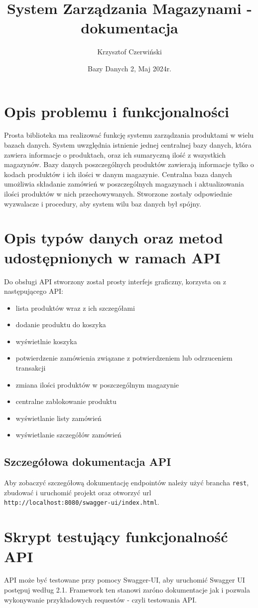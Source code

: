 \documentclass{article}
\title{System Zarządzania Magazynami - dokumentacja}
\author{Krzysztof Czerwiński}
\date{Bazy Danych 2, Maj 2024r.}
\begin{document}
\maketitle

\section{Opis problemu i funkcjonalności}
Prosta biblioteka ma realizować funkcję systemu zarządzania produktami w wielu bazach danych. System uwzględnia istnienie jednej centralnej bazy danych, która zawiera informacje o produktach, oraz ich sumaryczną ilość z wszystkich magazynów. Bazy danych poszczególnych produktów zawierają informacje tylko o kodach produktów i ich ilości w danym magazynie. Centralna baza danych umożliwia składanie zamówień w poszczególnych magazynach i aktualizowania ilości produktów w nich przechowywanych. Stworzone zostały odpowiednie wyzwalacze i procedury, aby system wilu baz danych był spójny.
\section{Opis typów danych oraz metod udostępnionych w ramach API}
Do obsługi API stworzony został prosty interfejs graficzny, korzysta on z następującego API:
\begin{itemize}
    \item lista produktów wraz z ich szczegółami
    \item dodanie produktu do koszyka
    \item wyświetlnie koszyka
    \item potwierdzenie zamówienia związane z potwierdzeniem lub odrzuceniem transakcji
    \item zmiana ilości produktów w poszczególnym magazynie
    \item centralne zablokowanie produktu
    \item wyświetlanie listy zamówień
    \item wyświetlanie szczegółów zamówień
\end{itemize}
\subsection{Szczegółowa dokumentacja API}
Aby zobaczyć szczegółową dokumentację endpointów należy użyć brancha \verb|rest|, zbudować i uruchomić projekt oraz otworzyć url \verb|http://localhost:8080/swagger-ui/index.html|. 
\section{Skrypt testujący funkcjonalność API}
API może być testowane przy pomocy Swagger-UI, aby uruchomić Swagger UI postępuj według 2.1. Framework ten stanowi zaróno dokumentacje jak i pozwala wykonywanie przykładowych requestów - czyli testowania API.
\end{document}

